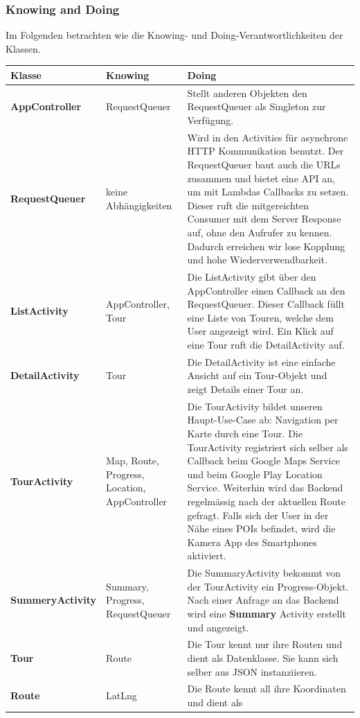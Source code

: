 \documentclass[a4paper,10pt,xetex]{article}
\begin{document}
\subsubsection{Knowing and Doing}\label{knowinganddoing-frontend}
Im Folgenden betrachten wie die Knowing- und Doing-Verantwortlichkeiten der Klassen.
\begin{longtabu} to \textwidth { | l | X[2, l] | X[8, l] |  }
\hline
\textbf{Klasse} & \textbf{Knowing} & \textbf{Doing} \\\hline
\endhead
\textbf{AppController} & RequestQueuer & Stellt anderen Objekten den RequestQueuer
als Singleton zur Verfügung.\\\hline
\textbf{RequestQueuer} & keine Abhängigkeiten & Wird in den Activities für asynchrone
HTTP Kommunikation benutzt. Der RequestQueuer baut auch die URLs zusammen und bietet
eine API an, um mit Lambdas Callbacks zu setzen. Dieser ruft die mitgereichten
Consumer mit dem Server Response auf, ohne den Aufrufer zu kennen. Dadurch erreichen
wir lose Kopplung und hohe Wiederverwendbarkeit. \\\hline
\textbf{ListActivity} & AppController, Tour & Die ListActivity gibt über den AppController
einen Callback an den RequestQueuer. Dieser Callback füllt eine Liste von Touren,
welche dem User angezeigt wird. Ein Klick auf eine Tour ruft die DetailActivity auf.
\\\hline
\textbf{DetailActivity} & Tour & Die DetailActivity ist eine einfache Ansicht auf
ein Tour-Objekt und zeigt Details einer Tour an.\\\hline
\textbf{TourActivity} & Map, Route, Progress, Location, AppController & Die TourActivity bildet
unseren Haupt-Use-Case ab: Navigation per Karte durch eine Tour. Die TourActivity
registriert sich selber als Callback beim Google Maps Service und beim Google
Play Location Service. Weiterhin wird das Backend regelmässig nach der aktuellen
Route gefragt. Falls sich der User in der Nähe eines POIs befindet, wird die
Kamera App des Smartphones aktiviert.\\\hline
\textbf{SummeryActivity} & Summary, Progress, RequestQueuer & Die SummaryActivity
bekommt von der TourActivity ein Progress-Objekt. Nach einer Anfrage an das
Backend wird eine \textbf{Summary} Activity erstellt und angezeigt.\\\hline
\textbf{Tour} & Route & Die Tour kennt nur ihre Routen und dient als Datenklasse.
Sie kann sich selber aus JSON instanziieren.\\\hline
\textbf{Route} & LatLng & Die Route kennt all ihre Koordinaten und dient als

\end{longtabu}
\end{document}

